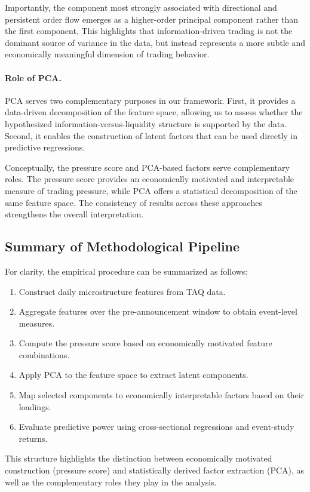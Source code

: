 Importantly, the component most strongly associated with directional and persistent order flow emerges as a higher-order principal component rather than the first component. This highlights that information-driven trading is not the dominant source of variance in the data, but instead represents a more subtle and economically meaningful dimension of trading behavior.

\paragraph{Role of PCA.}
PCA serves two complementary purposes in our framework. First, it provides a data-driven decomposition of the feature space, allowing us to assess whether the hypothesized information-versus-liquidity structure is supported by the data. Second, it enables the construction of latent factors that can be used directly in predictive regressions.

Conceptually, the pressure score and PCA-based factors serve complementary roles. The pressure score provides an economically motivated and interpretable measure of trading pressure, while PCA offers a statistical decomposition of the same feature space. The consistency of results across these approaches strengthens the overall interpretation.

\subsection{Summary of Methodological Pipeline}

For clarity, the empirical procedure can be summarized as follows:
\begin{enumerate}
    \item Construct daily microstructure features from TAQ data.
    \item Aggregate features over the pre-announcement window to obtain event-level measures.
    \item Compute the pressure score based on economically motivated feature combinations.
    \item Apply PCA to the feature space to extract latent components.
    \item Map selected components to economically interpretable factors based on their loadings.
    \item Evaluate predictive power using cross-sectional regressions and event-study returns.
\end{enumerate}

This structure highlights the distinction between economically motivated construction (pressure score) and statistically derived factor extraction (PCA), as well as the complementary roles they play in the analysis.
